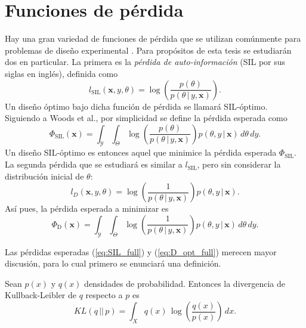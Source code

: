 \section{Funciones de pérdida}

Hay una gran variedad de funciones de pérdida que se utilizan comúnmente para problemas de diseño experimental \citep[ver][Capítulos 2.2, 2.4, 2.5]{chaloner_verdinelli_doe}. Para propósitos de esta tesis se estudiarán dos en particular. La primera es la \textit{pérdida de auto-información} (SIL por sus siglas en inglés), definida como
\begin{equation} \label{eq:SIL}
	l_{\text{SIL}} (\mathbf{x}, y, \theta) = \log \left( \frac{p(\theta )}{p(\theta \, | \, y, \mathbf{x})} \right).
\end{equation}
Un diseño óptimo bajo dicha función de pérdida se llamará SIL-óptimo. Siguiendo a Woods et al., por simplicidad se define la pérdida esperada como
\begin{equation} \label{eq:SIL_full}
	\Phi_{\text{SIL}} (\mathbf{x}) = \int_{\mathcal{Y}} \int_{\Theta} \log \left( \frac{p(\theta )}{p(\theta \, | \, y, \mathbf{x})} \right) p( \theta, y \, | \, \mathbf{x} ) \,d\theta \,dy.
\end{equation}
Un diseño SIL-óptimo es entonces aquel que minimice la pérdida esperada $\Phi_{\text{SIL}}$. \\

La segunda pérdida que se estudiará es similar a $l_{\text{SIL}}$, pero sin considerar la distribución inicial de $\theta$:
\begin{equation} \label{eq:D_opt}
	l_D(\mathbf{x}, y, \theta) = \log \left( \frac{1}{p(\theta \, | \, y, \mathbf{x})} \right) p( \theta, y \, | \, \mathbf{x} ).
\end{equation}
Así pues, la pérdida esperada a minimizar es
\begin{equation} \label{eq:D_opt_full}
	\Phi_{\text{D}} (\mathbf{x}) = \int_{\mathcal{Y}} \int_{\Theta} \log \left( \frac{1}{p(\theta \, | \, y, \mathbf{x})} \right) p( \theta, y \, | \, \mathbf{x} ) \,d\theta \,dy.
\end{equation}

Las pérdidas esperadas (\ref{eq:SIL_full}) y (\ref{eq:D_opt_full}) merecen mayor discusión, para lo cual primero se enunciará una definición.

\begin{definition}
	Sean $p(x)$ y $q(x)$ densidades de probabilidad. Entonces la divergencia de Kullback-Leibler de $q$ respecto a $p$ es
    \begin{equation} \label{eq:KLdivergence}
    	KL(q \, || \, p) = \int_{X} q(x) \, \log \left( \frac{ q(x) }{ p(x) } \right) \, dx.
    \end{equation}
\end{definition}

